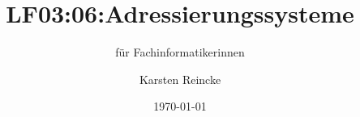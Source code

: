 \documentclass[]{beamer}
\title{LF03:06:Adressierungssysteme}
\subtitle{für Fachinformatikerinnen}
\institute{GS-LDK}
\author{Karsten Reincke}
\date{\today}
\def\cfgGl{../../../cfg.gl/}
\begin{document}

\begin{frame}
  \titlepage
\end{frame}






\logo{}
\newpage



%
\end{document}
